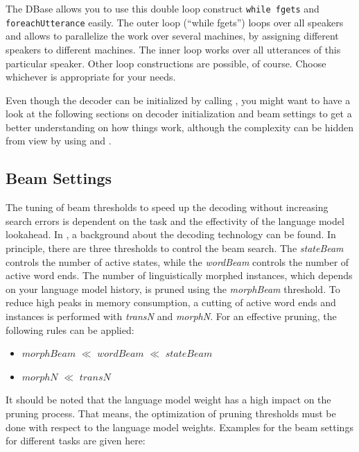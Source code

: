 The  DBase allows you to use  this double loop construct \texttt{while
fgets} and \texttt{foreachUtterance}  easily. The  outer loop (``while
fgets'') loops  over all speakers and allows  to  parallelize the work
over several machines,  by assigning  different speakers to  different
machines. The inner loop works  over all utterances of this particular
speaker.   Other loop constructions are   possible, of course.  Choose
whichever   is appropriate   for    your   needs.

Even     though   the   decoder  can    be    initialized  by  calling
, you might want to have  a look at the following
sections on  decoder initialization and beam settings  to get a better
understanding  on   how things work,  although   the complexity can be
hidden      from    view     by     using      and
.

\subsection{Beam Settings}

The tuning   of beam  thresholds  to  speed   up the decoding  without
increasing search errors is dependent on  the task and the effectivity
of  the language    model  lookahead.   In  \cite{soltau:asru2001},  a
background about the decoding  technology can be found.  In principle,
there  are  three  thresholds to control   the  beam search.  The {\em
stateBeam} controls  the number   of  active states,  while the   {\em
wordBeam} controls the   number of active  word  ends.  The number  of
linguistically morphed instances, which depends on your language model
history,  is pruned  using  the {\em morphBeam}  threshold.  To reduce
high peaks in  memory consumption, a cutting  of active word  ends and
instances is  performed with {\em  transN} and  {\em morphN}.   For an
effective pruning, the following rules can be applied:

\begin{itemize}
\item $morphBeam$ $\ll$ $wordBeam$ $\ll$ $stateBeam$
\item $morphN$ $\ll$ $transN$ 
\end{itemize}

It should be noted that the language model weight has a high impact on
the   pruning  process.   That  means,  the  optimization  of  pruning
thresholds must    be done  with  respect   to  the   language   model
weights. Examples for the beam settings  for different tasks are given
here:

